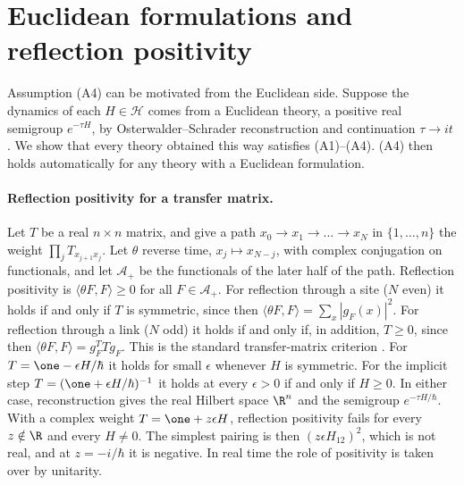 
\section{Euclidean formulations and reflection positivity}\label{sec:rp}

Assumption (A4) can be motivated from the Euclidean side. Suppose the dynamics of each $H\in\mathcal{H}$ comes from a Euclidean theory, a positive real semigroup $e^{-\tau H}$, by Osterwalder--Schrader reconstruction and continuation $\tau\to it$ \cite{OS1,OS2}. We show that every theory obtained this way satisfies (A1)--(A4). (A4) then holds automatically for any theory with a Euclidean formulation.

\paragraph{Reflection positivity for a transfer matrix.}
Let $T$ be a real $n\times n$ matrix, and give a path $x_0\to x_1\to\dots\to x_N$ in $\{1,\dots,n\}$ the weight $\prod_j T_{x_{j+1}x_j}$. Let $\theta$ reverse time, $x_j\mapsto x_{N-j}$, with complex conjugation on functionals, and let $\mathcal{A}_+$ be the functionals of the later half of the path. Reflection positivity is $\langle\theta F,F\rangle\ge 0$ for all $F\in\mathcal{A}_+$. For reflection through a site ($N$ even) it holds if and only if $T$ is symmetric, since then $\langle\theta F,F\rangle=\sum_x|g_F(x)|^2$. For reflection through a link ($N$ odd) it holds if and only if, in addition, $T\ge 0$, since then $\langle\theta F,F\rangle=g_F^{T}Tg_F$. This is the standard transfer-matrix criterion \cite{OsterwalderSeiler,FILS,GlimmJaffe}. For $T=\one-\epsilon H/\hbar$ it holds for small $\epsilon$ whenever $H$ is symmetric. For the implicit step $T=(\one+\epsilon H/\hbar)^{-1}$ it holds at every $\epsilon>0$ if and only if $H\ge0$. In either case, reconstruction gives the real Hilbert space $\R^n$ and the semigroup $e^{-\tau H/\hbar}$. With a complex weight $T=\one+z\epsilon H$, reflection positivity fails for every $z\notin\R$ and every $H\neq 0$. The simplest pairing is then $(z\epsilon H_{12})^2$, which is not real, and at $z=-i/\hbar$ it is negative. In real time the role of positivity is taken over by unitarity.

